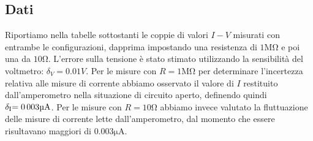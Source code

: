\documentclass[a4paper]{article}
\begin{document}
\subsection{Dati}
Riportiamo nella tabelle sottostanti le coppie di valori \(I-V\) misurati con entrambe le configurazioni, dapprima impostando una resistenza di $1\si{\mega\ohm}$ e poi una da $10\si{\ohm}$.
L'errore sulla tensione è stato stimato utilizzando la sensibilità del voltmetro: \( \si{\delta_{V}=0.01 V} \). Per le misure con \(R=1\si{\mega\ohm}\) per determinare l'incertezza relativa alle misure di corrente abbiamo osservato il valore di \(I\) restituito dall'amperometro nella situazione di circuito aperto, definendo quindi \( \si{\delta_{I}=0.003 {\micro\ampere}} \). Per le misure con \(R=10\si{\ohm}\) abbiamo invece valutato la fluttuazione delle misure di corrente lette dall'amperometro, dal momento che essere risultavano maggiori di $0.003 \si{\micro\ampere}$.
\end{document}
